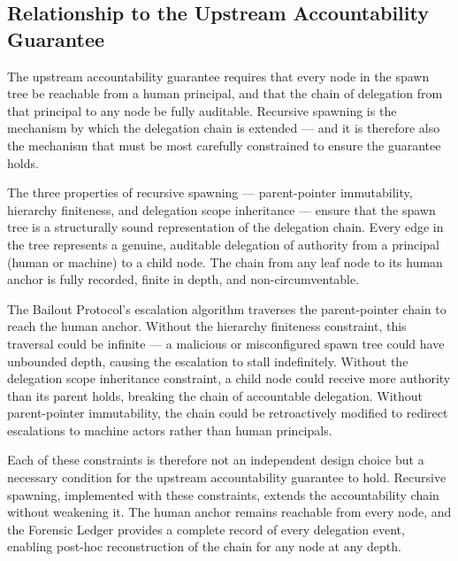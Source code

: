 \subsection{Relationship to the Upstream Accountability Guarantee}\label{sec:spawn-uag}

The upstream accountability guarantee requires that every node in the spawn tree be reachable from a human principal, and that the chain of delegation from that principal to any node be fully auditable. Recursive spawning is the mechanism by which the delegation chain is extended — and it is therefore also the mechanism that must be most carefully constrained to ensure the guarantee holds.

The three properties of recursive spawning — parent-pointer immutability, hierarchy finiteness, and delegation scope inheritance — ensure that the spawn tree is a structurally sound representation of the delegation chain. Every edge in the tree represents a genuine, auditable delegation of authority from a principal (human or machine) to a child node. The chain from any leaf node to its human anchor is fully recorded, finite in depth, and non-circumventable.

The Bailout Protocol's escalation algorithm traverses the parent-pointer chain to reach the human anchor. Without the hierarchy finiteness constraint, this traversal could be infinite — a malicious or misconfigured spawn tree could have unbounded depth, causing the escalation to stall indefinitely. Without the delegation scope inheritance constraint, a child node could receive more authority than its parent holds, breaking the chain of accountable delegation. Without parent-pointer immutability, the chain could be retroactively modified to redirect escalations to machine actors rather than human principals.

Each of these constraints is therefore not an independent design choice but a necessary condition for the upstream accountability guarantee to hold. Recursive spawning, implemented with these constraints, extends the accountability chain without weakening it. The human anchor remains reachable from every node, and the Forensic Ledger provides a complete record of every delegation event, enabling post-hoc reconstruction of the chain for any node at any depth.